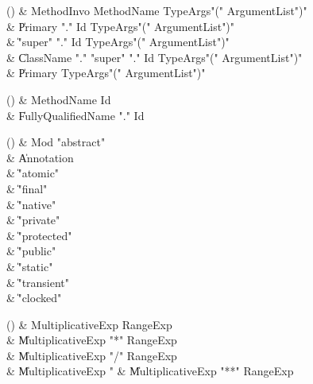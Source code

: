 \begin{bbgrammarappendix}{4.0in}

() & MethodInvo \label{prod:MethodInvo}  \: MethodName TypeArgs\opt \xcd"(" ArgumentList\opt \xcd")"  \\

 &    \| Primary \xcd"." Id TypeArgs\opt \xcd"(" ArgumentList\opt \xcd")" \\
 &    \| \xcd"super" \xcd"." Id TypeArgs\opt \xcd"(" ArgumentList\opt \xcd")" \\
 &    \| ClassName \xcd"." \xcd"super"  \xcd"." Id TypeArgs\opt \xcd"(" ArgumentList\opt \xcd")" \\
 &    \| Primary TypeArgs\opt \xcd"(" ArgumentList\opt \xcd")" \\

\end{bbgrammarappendix}

\begin{bbgrammarappendix}{4.0in}

() & MethodName \label{prod:MethodName}  \: Id  \\

 &    \| FullyQualifiedName \xcd"." Id \\

\end{bbgrammarappendix}

\begin{bbgrammarappendix}{4.7in}

() & Mod \label{prod:Mod}  \: \xcd"abstract"  \\

 &    \| Annotation \\
 &    \| \xcd"atomic" \\
 &    \| \xcd"final" \\
 &    \| \xcd"native" \\
 &    \| \xcd"private" \\
 &    \| \xcd"protected" \\
 &    \| \xcd"public" \\
 &    \| \xcd"static" \\
 &    \| \xcd"transient" \\
 &    \| \xcd"clocked" \\

\end{bbgrammarappendix}

\begin{bbgrammarappendix}{3.3in}

() & MultiplicativeExp \label{prod:MultiplicativeExp}  \: RangeExp  \\

 &    \| MultiplicativeExp \xcd"*" RangeExp \\
 &    \| MultiplicativeExp \xcd"/" RangeExp \\
 &    \| MultiplicativeExp \xcd"%
 &    \| MultiplicativeExp \xcd"**" RangeExp \\

\end{bbgrammarappendix}

